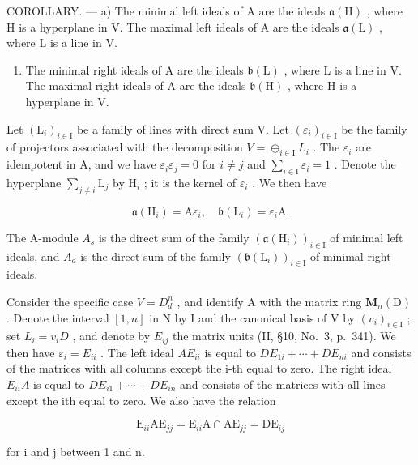 COROLLARY. --- a) The minimal left ideals of A are the ideals \(\mathfrak{a}(\mathrm{H})\) , where H is a hyperplane in V. The maximal left ideals of A are the ideals \(\mathfrak{a}(\mathrm{L})\) , where L is a line in V.

\begin{enumerate}
\def\labelenumi{\alph{enumi})}
\setcounter{enumi}{1}
\tightlist
\item
  The minimal right ideals of A are the ideals \(\mathfrak{b}(\mathrm{L})\) , where L is a line in V. The maximal right ideals of A are the ideals \(\mathfrak{b}(\mathrm{H})\) , where H is a hyperplane in V.
\end{enumerate}

Let \((\mathrm{L}_{i})_{i\in\mathrm{I}}\) be a family of lines with direct sum V. Let \((\varepsilon_{i})_{i\in\mathrm{I}}\) be the family of projectors associated with the decomposition \(V=\oplus_{i\in\mathrm{I}}L_{i}\) . The \(\varepsilon_{i}\) are idempotent in A, and we have \(\varepsilon_{i}\varepsilon_{j} = 0\) for \(i\neq j\) and \(\sum_{i\in \mathrm{I}}\varepsilon_i = 1\) . Denote the hyperplane \(\sum_{j\neq i}\mathrm{L}_j\) by \(\mathrm{H}_i\) ; it is the kernel of \(\varepsilon_{i}\) . We then have

\[
\mathfrak {a} (\mathrm{H} _ {i}) = \mathrm{A}   \varepsilon_ {i}  , \quad \mathfrak {b} (\mathrm{L} _ {i}) = \varepsilon_ {i}   \mathrm{A}  .
\]

The A-module \(A_{s}\) is the direct sum of the family \((\mathfrak{a}(\mathrm{H}_{i}))_{i\in\mathrm{I}}\) of minimal left ideals, and \(A_{d}\) is the direct sum of the family \((\mathfrak{b}(\mathrm{L}_{i}))_{i\in\mathrm{I}}\) of minimal right ideals.

Consider the specific case \(V = D_{d}^{n}\) , and identify A with the matrix ring \(\mathbf{M}_{n}(\mathrm{D})\) . Denote the interval \([1, n]\) in N by I and the canonical basis of V by \((v_{i})_{i \in \mathrm{I}}\) ; set \(L_{i} = v_{i}D\) , and denote by \(E_{ij}\) the matrix units (II, §10, No.~3, p.~341). We then have \(\varepsilon_{i} = E_{ii}\) . The left ideal \(AE_{ii}\) is equal to \(DE_{1i} + \cdots + DE_{ni}\) and consists of the matrices with all columns except the i-th equal to zero. The right ideal \(E_{ii}A\) is equal to \(DE_{i1} + \cdots + DE_{in}\) and consists of the matrices with all lines except the ith equal to zero. We also have the relation

\[
\mathrm{E} _ {i i} \mathrm{AE} _ {j j} = \mathrm{E} _ {i i} \mathrm{A} \cap \mathrm{AE} _ {j j} = \mathrm{DE} _ {i j}
\]

for i and j between 1 and n.
\relax{}

